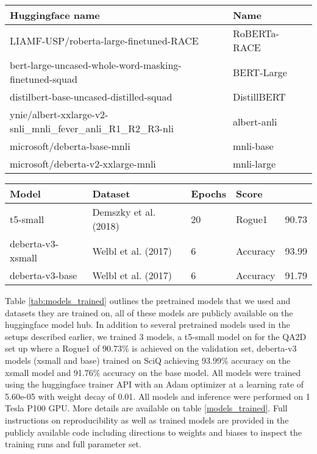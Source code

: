 \documentclass[11pt]{article}
\begin{document}
\begin{table*}[]
\centering
\begin{tabular}{lll}
\hline
Huggingface name & Name \\ \hline
LIAMF-USP/roberta-large-finetuned-RACE & RoBERTa-RACE \\
bert-large-uncased-whole-word-masking-finetuned-squad & BERT-Large \\
distilbert-base-uncased-distilled-squad & DistillBERT \\
ynie/albert-xxlarge-v2-snli\_mnli\_fever\_anli\_R1\_R2\_R3-nli & albert-anli \\
microsoft/deberta-base-mnli & mnli-base \\
microsoft/deberta-v2-xxlarge-mnli & mnli-large \\ \hline
\end{tabular}
\caption{Pretrained models that we used.}
\label{tab:models_trained}
\end{table*}

\begin{table*}[t]
\centering
\begin{tabular}{lllll}
\hline
Model & Dataset & Epochs & Score &  \\ \hline
t5-small & Demszky et al. (2018) & 20 & Rogue1 & 90.73 \\
deberta-v3-xsmall & Welbl et al. (2017) & 6 & Accuracy & 93.99 \\
deberta-v3-base & Welbl et al. (2017) & 6 & Accuracy & 91.79 \\ \hline
\end{tabular}
\caption{The models we trained for or setups with evaluation scores and number of epochs trained.}
\label{tab:models_trained}
\end{table*}
Table \ref{tab:models_trained} outlines the pretrained models that we used and datasets they are trained on, all of these models are publicly available on the huggingface model hub.
In addition to several pretrained models used in the setups described earlier, we trained 3 models, a t5-small model on \citet{demszky_transforming_2018} for the QA2D set up where a Rogue1 of 90.73\% is achieved on the validation set, deberta-v3 models (xsmall and base) trained on SciQ \citep{welbl_crowdsourcing_2017} achieving 93.99\% accuracy on the xsmall model and 91.76\% accuracy on the base model. All models were trained using the huggingface trainer API \citep{wolf_huggingfaces_2020} with an Adam optimizer at a learning rate of 5.60e-05 with weight decay of 0.01. All models and inference were performed on 1 Tesla P100 GPU. More details are available on table \ref{models_trained}.
Full instructions on reproducibility as well as trained models are provided in the publicly available code including directions to weights and biases to inspect the training runs and full parameter set.
\end{document}
